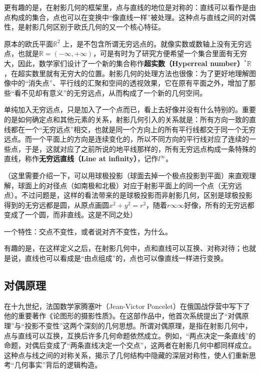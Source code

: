 更有趣的是，在射影几何的框架里，点与直线的地位是对称的：直线可以看作是由点构成的集合，点也可以在变换中“像直线一样”被处理。这种点与直线之间的对偶性，是射影几何区别于欧氏几何的又一个核心特征。







原本的欧氏平面$\mathbb{R}^2$ 上，是不包含所谓无穷远点的。就像实数或数轴上没有无穷远点，也就是$\mathbb{R}=(-\infty,+\infty)$，可是有时为了研究方便希望一个集合里面有无穷大，因此，数学家们设计了一个新的集合称作\textbf{超实数（Hyperreal number）}$^*\mathbb{R}$，在超实数里就有无穷大的位置。射影几何的处理方法也很像：为了更好地理解图像中的“消失点”、平行线的汇聚和空间的透视效果，它在原有平面之外，增加了那些“看不见却有意义”的无穷远点，从而构成了一个新的几何空间。

单纯加入无穷远点，只是加入了一个点而已，看上去好像并没有什么特别的。重要的是如何确定点和其他元素的关系，射影几何引入的关系就是：所有方向一致的直线都在一个“无穷远点”相交，也就是同一个方向上的所有平行线都交于同一个无穷远点。而一个平面上的方向是连续变化的，所以不同方向的平行线对应了连续的一些点，于是，这就对应了之前所说的地平线那样的，所有无穷远点构成一条特殊的直线，称作\textbf{无穷远直线（Line at infinity）}，记作$l^\infty$。

（这里需要介绍一下，可以用球极投影（球面去掉一个极点投影到平面）来直观理解，球面上的对径点（如南极和北极）对应于射影平面上的同一个点（无穷远点）。不过问题是，这样的看法带来的是球极投影而非射影几何，区别是球极投影得到的无穷远都是圆，从原点画圆$x^2+y^2=r^2$，随着$r\infty\infty$好像，所有的无穷远都变成了一个圆，而非直线。这是不同之处）

一个特性：交点不变性，或者说对齐不变性，为什么。

有趣的是，在这样定义之后，在射影几何中，点和直线可以互换、对称对待；也就是说，直线也可以看成是“由点组成”的，点也可以像直线一样进行变换。

\subsection{对偶原理}

在十九世纪，法国数学家腾塞叶（Jean-Victor Poncelet）在俄国战俘营中写下了他的重要著作《论图形的摄影性质》。在这部作品中，他首次系统提出了“对偶原理”与“投影不变性”这两个深刻的几何思想。所谓对偶原理，是指在射影几何中，点与直线可以互换，互换后许多几何命题依然成立。例如，“两点决定一条直线”的命题，对偶后变成了“两条直线决定一个交点”，这两者在射影几何中都同样成立。这种点与线之间的对称关系，揭示了几何结构中隐藏的深层对称性，使人们重新思考“几何事实”背后的逻辑构造。

